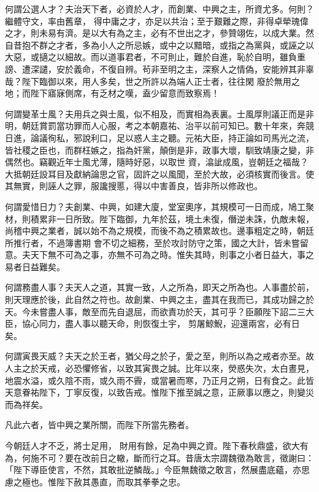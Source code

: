 \begin{pinyinscope}
 何謂公選人才？夫治天下者，必資於人才，而創業、中興之主，所資尤多。何則？繼體守文，率由舊章，
 得中庸之才，亦足以共治；至于艱難之際，非得卓犖瑰偉之才，則未易有濟。是以大有為之主，必有不世出之才，參贊翊佐，以成大業。然自昔抱不群之才者，多為小人之所忌嫉，或中之以黯暗，或指之為黨與，或誣之以大惡，或擿之以細故。而以道事君者，不可則止，難於自進，恥於自明，雖負重謗、遭深譴，安於義命，不復自辨。茍非至明之主，深察人之情偽，安能辨其非辜哉？陛下臨御以來，用人多矣，世之所許以為端人正士者，往往閑
 廢於無用之地；而陛下寤寐側席，有乏材之嘆，盍少留意而致察焉！



 何謂變革士風？夫用兵之與士風，似不相及，而實相為表裏。士風厚則議正而是非明，朝廷賞罰當功罪而人心服，考之本朝嘉祐、治平以前可知已。數十年來，奔競日進，論議徇私，邪說利口，足以惑人主之聽。元祐大臣，持正論如司馬光之流，皆社稷之臣也，而群枉嫉之，指為奸黨，顛倒是非，政事大壞，馴致靖康之變，非偶然也。竊觀近年士風尤薄，隨時好惡，以取世
 資，潝訿成風，豈朝廷之福哉？大抵朝廷設耳目及獻納論思之官，固許之以風聞，至於大故，必須核實而後言。使其無實，則誣人之罪，服讒搜慝，得以中害善良，皆非所以修政也。



 何謂愛惜日力？夫創業、中興，如建大廈，堂室奧序，其規模可一日而成，鳩工聚材，則積累非一日所致。陛下臨御，九年於茲，境土未復，僭逆未誅，仇敵未報，尚稽中興之業者，誠以始不為之規模，而後不為之積累故也。邊事粗定之時，朝廷所推行者，不過簿書期
 會不切之細務，至於攻討防守之策，國之大計，皆未嘗留意。夫天下無不可為之事，亦無不可為之時。惟失其時，則事之小者日益大，事之易者日益難矣。



 何謂務盡人事？夫天人之道，其實一致，人之所為，即天之所為也。人事盡於前，則天理應於後，此自然之符也。故創業、中興之主，盡其在我而已，其成功歸之於天。今未嘗盡人事，敵至而先自退屈，而欲責功於天，其可乎？臣願陛下詔二三大臣，協心同力，盡人事以聽天命，則恢復土宇，
 剪屠鯨鯢，迎還兩宮，必有日矣。



 何謂寅畏天威？夫天之於王者，猶父母之於子，愛之至，則所以為之戒者亦至。故人主之於天戒，必恐懼修省，以致其寅畏之誠。比年以來，熒惑失次，太白晝見，地震水溢，或久陰不雨，或久雨不霽，或當暑而寒，乃正月之朔，日有食之。此皆天意眷祐陛下，丁寧反復，以致告戒。惟陛下推至誠之意，正厥事以應之，則變災而為祥矣。



 凡此六者，皆中興之業所關，而陛下所當先務者。



 今朝廷人才不乏，將士足用，
 財用有餘，足為中興之資。陛下春秋鼎盛，欲大有為，何施不可？要在改前日之轍，斷而行之耳。昔唐太宗謂魏徵為敢言，徵謝曰：「陛下導臣使言，不然，其敢批逆鱗哉。」今臣無魏徵之敢言，然展盡底蘊，亦思慮之極也。惟陛下赦其愚直，而取其拳拳之忠。




\end{pinyinscope}
